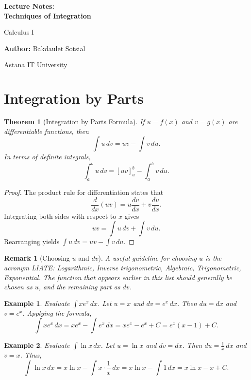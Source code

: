 \documentclass[11pt,a4paper]{article}
\newtheorem{example}{Example}
\newtheorem{theorem}{Theorem}
\newtheorem{remark}{Remark}
\begin{document}
\begin{titlepage}
\centering
\vspace*{4cm}
{\Huge\bfseries Lecture Notes:\\ Techniques of Integration\par}
\vspace{1cm}
{\Large Calculus I\par}
\vspace{2cm}
{\large \textbf{Author:} Bakdaulet Sotsial\par}
\vspace{1cm}
\vfill
{\small Astana IT University \par}
\vspace*{2cm}
\end{titlepage}
\tableofcontents
\newpage
\section{Integration by Parts}
\begin{theorem}[Integration by Parts Formula]
If $u = f(x)$ and $v = g(x)$ are differentiable functions, then
\[
\int u \, dv = uv - \int v \, du.
\]
In terms of definite integrals,
\[
\int_a^b u \, dv = \left[ uv \right]_a^b - \int_a^b v \, du.
\]
\end{theorem}
\begin{proof}
The product rule for differentiation states that
\[
\frac{d}{dx}(uv) = u \frac{dv}{dx} + v \frac{du}{dx}.
\]
Integrating both sides with respect to $x$ gives
\[
uv = \int u \, dv + \int v \, du.
\]
Rearranging yields $\int u \, dv = uv - \int v \, du$.
\end{proof}
\begin{remark}[Choosing $u$ and $dv$]
A useful guideline for choosing $u$ is the acronym LIATE: Logarithmic, Inverse trigonometric, Algebraic, Trigonometric, Exponential. The function that appears earlier in this list should generally be chosen as $u$, and the remaining part as $dv$.
\end{remark}
\begin{example}
Evaluate $\displaystyle \int x e^x \, dx$.
Let $u = x$ and $dv = e^x \, dx$. Then $du = dx$ and $v = e^x$. Applying the formula,
\[
\int x e^x \, dx = x e^x - \int e^x \, dx = x e^x - e^x + C = e^x(x - 1) + C.
\]
\end{example}
\begin{example}
Evaluate $\displaystyle \int \ln x \, dx$.
Let $u = \ln x$ and $dv = dx$. Then $du = \frac{1}{x} \, dx$ and $v = x$. Thus,
\[
\int \ln x \, dx = x \ln x - \int x \cdot \frac{1}{x} \, dx = x \ln x - \int 1 \, dx = x \ln x - x + C.
\]
\end{example}
\end{document}
